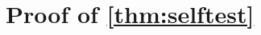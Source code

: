 \documentclass[11pt,letterpaper]{article}
\newcommand{\ket}[1]{|#1\rangle}
\newcommand{\ketbra}[2]{|#1\rangle\langle#2|}
\DeclareMathOperator{\Tr}{Tr}
\DeclareMathOperator{\supp}{supp}
\newcommand{\1}{\mathbb{1}}
\newcommand{\CHSH}{CHSH^{(d)}}
\newcommand{\SVT}{SVT}
\newcommand{\tA}{\tilde{A}}
\theoremstyle{definition}
\begin{document}






\appendix
\section{Proof of \cref{thm:selftest} }
\label{sec:selftest}
\end{document}
